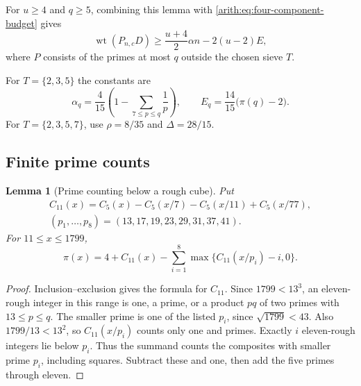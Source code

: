 \documentclass[11pt]{article}
\DeclareMathOperator{\wt}{wt}\DeclareMathOperator{\ord}{ord}
\numberwithin{equation}{section}
\newtheorem{lemma}[theorem]{Lemma}
\theoremstyle{definition}\newtheorem{definition}[theorem]{Definition}
\theoremstyle{remark}\newtheorem{remark}[theorem]{Remark}
\begin{document}
For $u\ge4$ and $q\ge5$, combining this lemma with
\eqref{arith:eq:four-component-budget} gives
\begin{equation}\label{arith:eq:one-step-component-bound}
             \wt(P_{n,c}D)\ge\frac{u+4}{2}\alpha n-2(u-2)E,
\end{equation}
where $P$ consists of the primes at most $q$ outside the chosen
sieve $T$.

For $T=\{2,3,5\}$ the constants are
\begin{equation}\label{arith:eq:base-five-sieve}
 \alpha_q=\frac4{15}\left(1-\sum_{7\le p\le q}\frac1p\right),
 \qquad E_q=\frac{14}{15}\bigl(\pi(q)-2\bigr).
\end{equation}
For $T=\{2,3,5,7\}$, use $\rho=8/35$ and $\Delta=28/15$.

\subsection{Finite prime counts}\label{arith:sec:written-low-range}
\label{sec:prime-blocks}

\begin{lemma}[Prime counting below a rough cube]
\label{arith:lem:rough-semiprime-count}
Put
\[
 \begin{gathered}
 C_{11}(x)=C_5(x)-C_5(x/7)-C_5(x/11)+C_5(x/77),\\
 (p_1,\ldots,p_8)=(13,17,19,23,29,31,37,41).
 \end{gathered}
\]
For $11\le x\le1799$,
\begin{equation}\label{arith:eq:small-prime-sieve}
 \pi(x)=4+C_{11}(x)
       -\sum_{i=1}^8\max\{C_{11}(x/p_i)-i,0\}.
\end{equation}
\end{lemma}
\begin{proof}
Inclusion--exclusion gives the formula for $C_{11}$. Since
$1799<13^3$, an eleven-rough integer in this range is one, a prime,
or a product $pq$ of two primes with $13\le p\le q$.
The smaller prime is one of the listed $p_i$, since
$\sqrt{1799}<43$. Also $1799/13<13^2$, so $C_{11}(x/p_i)$ counts
only one and primes. Exactly $i$ eleven-rough integers lie below $p_i$.
Thus the summand counts the composites with smaller prime $p_i$,
including squares. Subtract these and one, then add the five
primes through eleven.
\end{proof}
\end{document}
